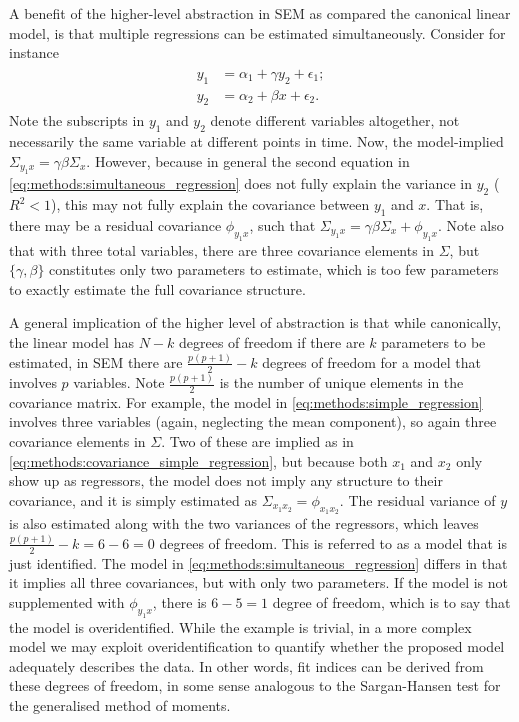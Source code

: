 A benefit of the higher-level abstraction in SEM as compared the canonical linear model, is that multiple regressions
can be estimated simultaneously. Consider for instance
\begin{align}
\begin{split}
    \label{eq:methods:simultaneous_regression}
    y_1 &= \alpha_1 + \gamma y_2 + \epsilon_1;\\
    y_2 &= \alpha_2 + \beta x + \epsilon_2.
\end{split}
\end{align}
Note the subscripts in $y_1$ and $y_2$ denote different variables altogether,
not necessarily the same variable at different points in time.
Now, the model-implied $\Sigma_{y_1 x} = \gamma \beta \Sigma_x$.
However, because in general the second equation in \cref{eq:methods:simultaneous_regression} does not fully explain the
variance in $y_2$ ($R^2 < 1$), this may not fully explain the covariance between $y_1$ and $x$.
That is, there may be a residual covariance $\phi_{y_1 x}$, such that $\Sigma_{y_1 x} = \gamma \beta \Sigma_x + \phi_{y_1 x}$.
Note also that with three total variables, there are three covariance elements in $\Sigma$, but $\{\gamma, \beta\}$
constitutes only two parameters to estimate, which is too few parameters to exactly estimate the full covariance structure.

A general implication of the higher level of abstraction is that while canonically, the linear model has $N - k$ degrees
of freedom if there are $k$ parameters to be estimated, in SEM there are $\frac{p(p+1)}{2} - k$ degrees of freedom
for a model that involves $p$ variables. Note $\frac{p(p+1)}{2}$ is the number of unique elements in the covariance matrix.
For example, the model in \cref{eq:methods:simple_regression} involves three variables (again, neglecting the mean component),
so again three covariance elements in $\Sigma$. Two of these are implied as in \cref{eq:methods:covariance_simple_regression},
but because both $x_1$ and $x_2$ only show up as regressors, the model does not imply any structure to their covariance,
and it is simply estimated as $\Sigma_{x_1 x_2} = \phi_{x_1 x_2}$. The residual variance of $y$ is also estimated along
with the two variances of the regressors, which leaves $\frac{p(p + 1)}{2} - k = 6 - 6 = 0$ degrees of freedom. This is
referred to as a model that is just identified.
The model in \cref{eq:methods:simultaneous_regression} differs in that it implies all three covariances, but with only two
parameters. If the model is not supplemented with $\phi_{y_1 x}$, there is $6 - 5 = 1$ degree of freedom, which is to
say that the model is overidentified.
While the example is trivial, in a more complex model we may exploit overidentification to quantify
whether the proposed model adequately describes the data. In other words, fit indices can be derived from these degrees
of freedom, in some sense analogous to the Sargan-Hansen test for the generalised method of moments.

